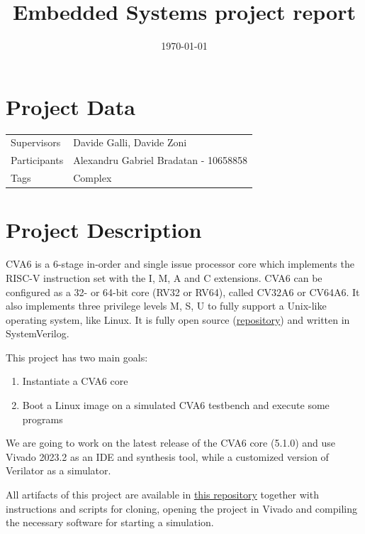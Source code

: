 \documentclass[a4paper,11pt]{article}
\title{Embedded Systems project report}
\author{}
\date{\today}
\begin{document}
\maketitle
\tableofcontents

\section{Project Data}

\begin{table}[H]
  \centering
  \begin{tabular}{ll}
    \toprule
    Supervisors   & Davide Galli, Davide Zoni \\
    Participants  & Alexandru Gabriel Bradatan - 10658858 \\
    Tags          & Complex \\
    \bottomrule
  \end{tabular}
\end{table}

\section{Project Description}

CVA6 is a 6-stage in-order and single issue processor core which implements the
RISC-V instruction set with the I, M, A and C extensions. CVA6 can be configured
as a 32- or 64-bit core (RV32 or RV64), called CV32A6 or CV64A6. It also implements three
privilege levels M, S, U to fully support a Unix-like operating system, like Linux.
It is fully open source (\href{https://github.com/openhwgroup/cva6}{repository})
and written in SystemVerilog.

This project has two main goals:

\begin{enumerate}
  \item Instantiate a CVA6 core
  \item Boot a Linux image on a simulated CVA6 testbench and execute some programs
\end{enumerate}

We are going to work on the latest release of the CVA6 core (5.1.0) and use
Vivado 2023.2 as an IDE and synthesis tool, while a customized version of Verilator
as a simulator.

All artifacts of this project are available in \href{https://github.com/alexbradd/embedded-systems-project-2024}{this repository}
together with instructions and scripts for cloning, opening the project in Vivado and
compiling the necessary software for starting a simulation.
\end{document}
